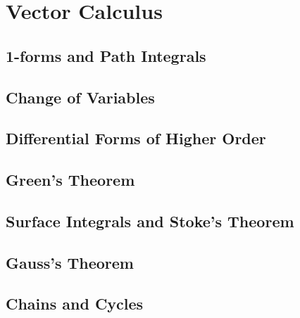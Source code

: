 \documentclass[12pt]{book}
\begin{document}
\chapter{Vector Calculus}
\section{1-forms and Path Integrals}


\section{Change of Variables}


\section{Differential Forms of Higher Order}


\section{Green's Theorem}


\section{Surface Integrals and Stoke's Theorem}


\section{Gauss's Theorem}



\section{Chains and Cycles}




\end{document}
